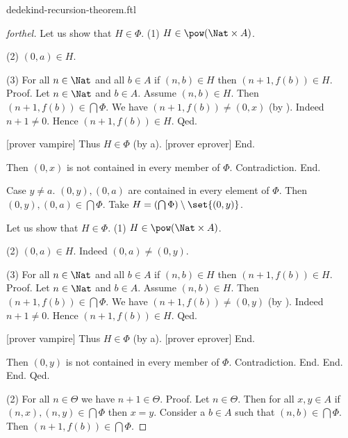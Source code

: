 \documentclass{naproche-library}
\begin{document}
\begin{smodule}{dedekind-recursion-theorem.ftl}
\begin{proof}[forthel]
              Let us show that $H \in \Phi$.
                (1) $H \in \pow(\Nat \times A)$.

                (2) $(0,a) \in H$.

                (3) For all $n \in \Nat$ and all $b \in A$ if
                $(n,b) \in H$ then $(n + 1, f(b)) \in H$. \newline
                Proof.
                  Let $n \in \Nat$ and $b \in A$.
                  Assume $(n,b) \in H$.
                  Then $(n + 1, f(b)) \in \bigcap \Phi$.
                  We have $(n + 1, f(b)) \neq (0,x)$ (by ).
                  Indeed $n + 1 \neq 0$.
                  Hence $(n + 1, f(b)) \in H$.
                Qed.

                [prover vampire]
                Thus $H \in \Phi$ (by a).
                [prover eprover]
              End.

              Then $(0,x)$ is not contained in every member of $\Phi$.
              Contradiction.
            End.

            Case $y \neq a$.
              $(0,y), (0,a)$ are contained in every element of $\Phi$.
              Then $(0,y), (0,a) \in \bigcap \Phi$.
              Take $H = (\bigcap \Phi) \setminus \set{(0,y)}$.

              Let us show that $H \in \Phi$.
                (1) $H \in \pow(\Nat \times A)$.

                (2) $(0,a) \in H$.
                Indeed $(0,a) \neq (0,y)$.

                (3) For all $n \in \Nat$ and all $b \in A$ if
                $(n,b) \in H$ then $(n + 1, f(b)) \in H$. \newline
                Proof.
                  Let $n \in \Nat$ and $b \in A$.
                  Assume $(n,b) \in H$.
                  Then $(n + 1, f(b)) \in \bigcap \Phi$.
                  We have $(n + 1, f(b)) \neq (0,y)$ (by ).
                  Indeed $n + 1 \neq 0$.
                  Hence $(n + 1, f(b)) \in H$.
                Qed.

                [prover vampire]
                Thus $H \in \Phi$ (by a).
                [prover eprover]
              End.

              Then $(0,y)$ is not contained in every member of $\Phi$.
              Contradiction.
            End.
          End.
        End.
      Qed.

      (2) For all $n \in \Theta$ we have $n + 1 \in \Theta$. \newline
      Proof.
        Let $n \in \Theta$.
        Then for all $x, y \in A$ if $(n, x), (n, y) \in \bigcap \Phi$ then
        $x = y$.
        Consider a $b \in A$ such that $(n,b) \in \bigcap \Phi$.
        Then $(n + 1, f(b)) \in \bigcap \Phi$.


\end{proof}
\end{smodule}
\end{document}

